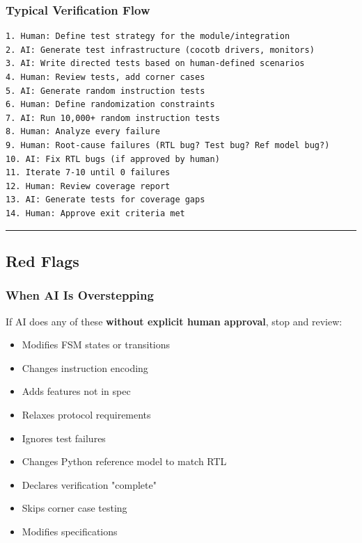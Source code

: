 \subsubsection{Typical Verification Flow}\label{cr:status:phase1-ai-human-responsibilities:typical-verification-flow}

\begin{record}

\begin{lstlisting}[language={}]
1. Human: Define test strategy for the module/integration
2. AI: Generate test infrastructure (cocotb drivers, monitors)
3. AI: Write directed tests based on human-defined scenarios
4. Human: Review tests, add corner cases
5. AI: Generate random instruction tests
6. Human: Define randomization constraints
7. AI: Run 10,000+ random instruction tests
8. Human: Analyze every failure
9. Human: Root-cause failures (RTL bug? Test bug? Ref model bug?)
10. AI: Fix RTL bugs (if approved by human)
11. Iterate 7-10 until 0 failures
12. Human: Review coverage report
13. AI: Generate tests for coverage gaps
14. Human: Approve exit criteria met
\end{lstlisting}

\begin{center}\rule{0.5\linewidth}{0.5pt}\end{center}

\end{record}

\subsection{\texorpdfstring{Red Flags \warn{}}{Red Flags }}\label{cr:status:phase1-ai-human-responsibilities:red-flags-triangular-flag-on-post}

\subsubsection{When AI Is Overstepping}\label{cr:status:phase1-ai-human-responsibilities:when-ai-is-overstepping}

\begin{record}

If AI does any of these \textbf{without explicit human approval}, stop
and review:

\begin{itemize}
\tightlist
\item
  \bad{} Modifies FSM states or transitions
\item
  \bad{} Changes instruction encoding
\item
  \bad{} Adds features not in spec
\item
  \bad{} Relaxes protocol requirements
\item
  \bad{} Ignores test failures
\item
  \bad{} Changes Python reference model to match RTL
\item
  \bad{} Declares verification "complete"
\item
  \bad{} Skips corner case testing
\item
  \bad{} Modifies specifications
\end{itemize}

\end{record}


